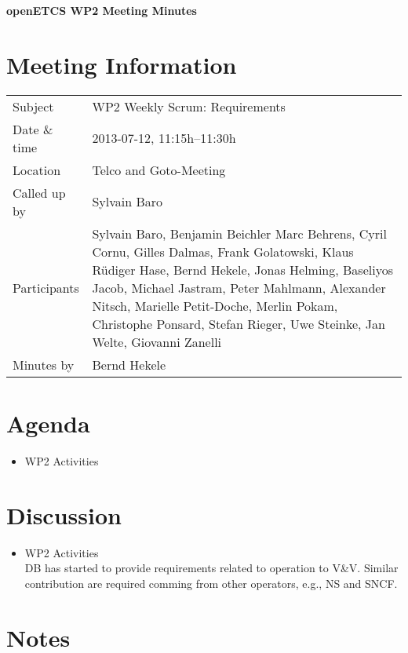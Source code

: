 \documentclass[a4paper, 11pt]{article}
\begin{document}
{\begin{center}\huge\bf openETCS WP2 Meeting Minutes\end{center}}
\section{Meeting Information}

\renewcommand{\arraystretch}{1.5}
\begin{supertabular}{m{.2\textwidth}m{.8\textwidth}}
Subject & WP2 Weekly Scrum: Requirements\\
Date \& time & 2013-07-12, 11:15h--11:30h\\
Location & Telco and Goto-Meeting\\
Called up by & Sylvain Baro\\
Participants &
Sylvain Baro,
Benjamin Beichler
Marc Behrens,
Cyril Cornu,
Gilles Dalmas,
Frank Golatowski,
Klaus R\"udiger Hase,
Bernd Hekele,
Jonas Helming,
Baseliyos Jacob,
Michael Jastram,
Peter Mahlmann,
Alexander Nitsch,
Marielle Petit-Doche,
Merlin Pokam,
Christophe Ponsard,
Stefan Rieger,
Uwe Steinke,
Jan Welte,
Giovanni Zanelli\\


Minutes by & Bernd Hekele\\

\end{supertabular}
\renewcommand{\arraystretch}{1.0}


\section{Agenda}
\begin{itemize}
\item WP2 Activities
\end{itemize}

\section{Discussion}

\begin{itemize}

\item WP2 Activities\\
DB has started to provide requirements related to operation to V\&V. Similar contribution are required comming from other operators, e.g., NS and SNCF.

\end{itemize}

\section{Notes}
\end{document}
